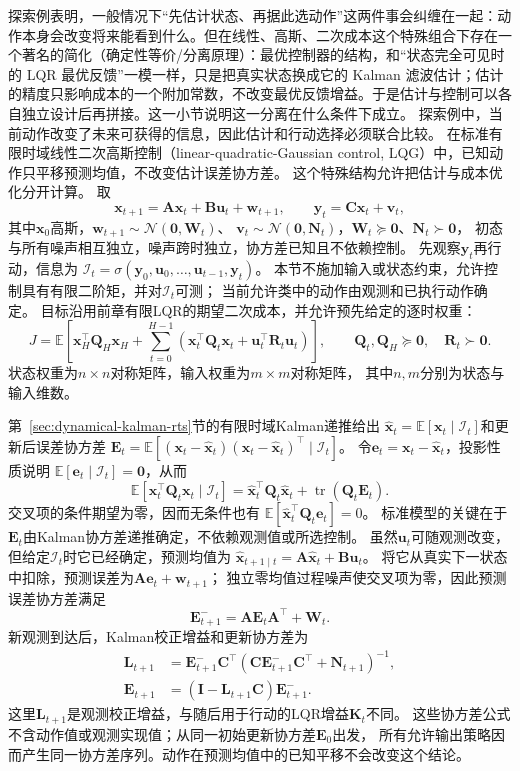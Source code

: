 探索例表明，一般情况下“先估计状态、再据此选动作”这两件事会纠缠在一起：动作本身会改变将来能看到什么。但在线性、高斯、二次成本这个特殊组合下存在一个著名的简化（确定性等价/分离原理）：最优控制器的结构，和“状态完全可见时的 LQR 最优反馈”一模一样，只是把真实状态换成它的 Kalman 滤波估计；估计的精度只影响成本的一个附加常数，不改变最优反馈增益。于是估计与控制可以各自独立设计后再拼接。这一小节说明这一分离在什么条件下成立。
探索例中，当前动作改变了未来可获得的信息，因此估计和行动选择必须联合比较。
在标准有限时域线性二次高斯控制（linear-quadratic-Gaussian control, LQG）中，已知动作只平移预测均值，不改变估计误差协方差。
这个特殊结构允许把估计与成本优化分开计算。
取
\[
  \bm x_{t+1}=\bm A\bm x_t+\bm B\bm u_t+\bm w_{t+1},
  \qquad \bm y_t=\bm C\bm x_t+\bm v_t,
\]
其中$\bm x_0$高斯，$\bm w_{t+1}\sim\mathcal N(\bm0,\bm W_t)$、
$\bm v_t\sim\mathcal N(\bm0,\bm N_t)$，$\bm W_t\succeq\bm0$、$\bm N_t\succ\bm0$，
初态与所有噪声相互独立，噪声跨时独立，协方差已知且不依赖控制。
先观察$\bm y_t$再行动，信息为
$\mathcal I_t=\sigma(\bm y_0,\bm u_0,\ldots,\bm u_{t-1},\bm y_t)$。
本节不施加输入或状态约束，允许控制具有有限二阶矩，并对$\mathcal I_t$可测；
当前允许类中的动作由观测和已执行动作确定。
目标沿用前章有限LQR的期望二次成本，并允许预先给定的逐时权重：
\[
  J=\mathbb E\left[\bm x_H^\top\bm Q_H\bm x_H
    +\sum_{t=0}^{H-1}
      (\bm x_t^\top\bm Q_t\bm x_t+\bm u_t^\top\bm R_t\bm u_t)\right],
  \qquad \bm Q_t,\bm Q_H\succeq\bm0,\quad\bm R_t\succ\bm0.
\]
状态权重为$n\times n$对称矩阵，输入权重为$m\times m$对称矩阵，
其中$n,m$分别为状态与输入维数。

第~\ref{sec:dynamical-kalman-rts}节的有限时域Kalman递推给出
$\widehat{\bm x}_t=\mathbb E[\bm x_t\mid\mathcal I_t]$和更新后误差协方差
$\bm E_t=\mathbb E[(\bm x_t-\widehat{\bm x}_t)
(\bm x_t-\widehat{\bm x}_t)^\top\mid\mathcal I_t]$。
令$\bm e_t=\bm x_t-\widehat{\bm x}_t$，投影性质说明
$\mathbb E[\bm e_t\mid\mathcal I_t]=\bm0$，从而
\[
  \mathbb E[\bm x_t^\top\bm Q_t\bm x_t\mid\mathcal I_t]
  =\widehat{\bm x}_t^\top\bm Q_t\widehat{\bm x}_t
    +\operatorname{tr}(\bm Q_t\bm E_t).
\]
交叉项的条件期望为零，因而无条件也有
$\mathbb E[\widehat{\bm x}_t^\top\bm Q_t\bm e_t]=0$。
标准模型的关键在于$\bm E_t$由Kalman协方差递推确定，不依赖观测值或所选控制。
虽然$\bm u_t$可随观测改变，但给定$\mathcal I_t$时它已经确定，预测均值为
$\widehat{\bm x}_{t+1\mid t}=\bm A\widehat{\bm x}_t+\bm B\bm u_t$。
将它从真实下一状态中扣除，预测误差为$\bm A\bm e_t+\bm w_{t+1}$；
独立零均值过程噪声使交叉项为零，因此预测误差协方差满足
\[
  \bm E_{t+1}^{-}=\bm A\bm E_t\bm A^\top+\bm W_t.
\]
新观测到达后，Kalman校正增益和更新协方差为
\begin{align*}
  \bm L_{t+1}
  &=\bm E_{t+1}^{-}\bm C^\top
    (\bm C\bm E_{t+1}^{-}\bm C^\top+\bm N_{t+1})^{-1},\\
  \bm E_{t+1}&=(\bm I-\bm L_{t+1}\bm C)\bm E_{t+1}^{-}.
\end{align*}
这里$\bm L_{t+1}$是观测校正增益，与随后用于行动的LQR增益$\bm K_t$不同。
这些协方差公式不含动作值或观测实现值；从同一初始更新协方差$\bm E_0$出发，
所有允许输出策略因而产生同一协方差序列。动作在预测均值中的已知平移不会改变这个结论。

